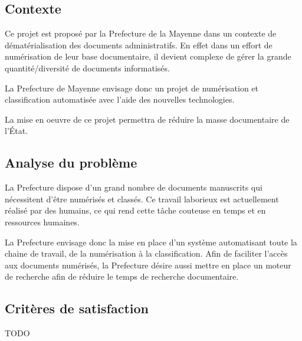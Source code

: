 

\subsection {Contexte}

Ce projet est proposé par la Prefecture de la Mayenne dans un contexte de dématérialisation des documents administratifs.
En effet dans un effort de numérisation de leur base documentaire, il devient complexe de gérer la grande quantité/diversité de documents informatisés. 

\par
La Prefecture de Mayenne envisage donc un projet de numérisation et classification automatisée avec l'aide des nouvelles technologies.

La mise en oeuvre de ce projet permettra de réduire la masse documentaire de l'État.


\subsection {Analyse du problème}
La Prefecture dispose d'un grand nombre de documents manuscrits qui nécessitent d'être numérisés et classés.
Ce travail laborieux est actuellement réalisé par des humains, ce qui rend cette tâche couteuse en temps et en ressources humaines.


La Prefecture envisage donc la mise en place d'un système automatisant toute la chaine de travail, de la numérisation à la classification.
Afin de faciliter l'accès aux documents numérisés, la Prefecture désire aussi mettre en place un moteur de recherche afin de réduire le temps de recherche documentaire.


\subsection {Critères de satisfaction}
TODO


